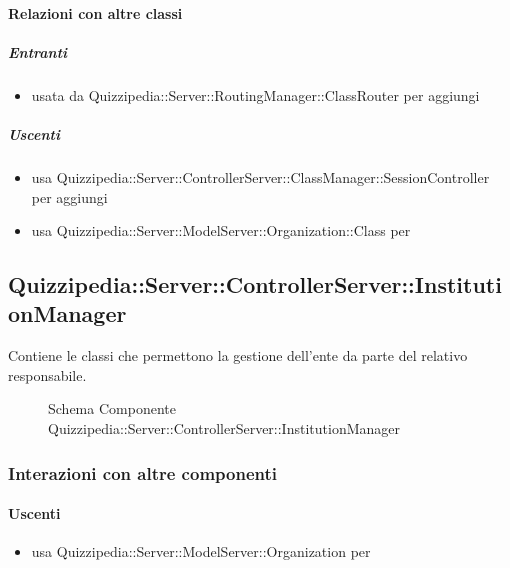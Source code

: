 \paragraph{Relazioni con altre classi}
\subparagraph{Entranti}
\begin{itemize}
\item usata da Quizzipedia::Server::RoutingManager::ClassRouter per aggiungi
\end{itemize}
\subparagraph{Uscenti}
\begin{itemize}
\item usa Quizzipedia::Server::ControllerServer::ClassManager::SessionController per aggiungi
\item usa Quizzipedia::Server::ModelServer::Organization::Class per 
\end{itemize}
\subsection{Quizzipedia::Server::ControllerServer::InstitutionManager}
Contiene le classi che permettono la gestione dell'ente da parte del relativo responsabile.
\begin{figure}[H]
\centering
\noindent{}
\caption[Schema Componente Quizzipedia::Server::ControllerServer::InstitutionManager]{Schema Componente Quizzipedia::Server::ControllerServer::InstitutionManager}
\end{figure}
\subsubsection{Interazioni con altre componenti}
\paragraph{Uscenti}
\begin{itemize}
\item usa Quizzipedia::Server::ModelServer::Organization per 
\end{itemize}
